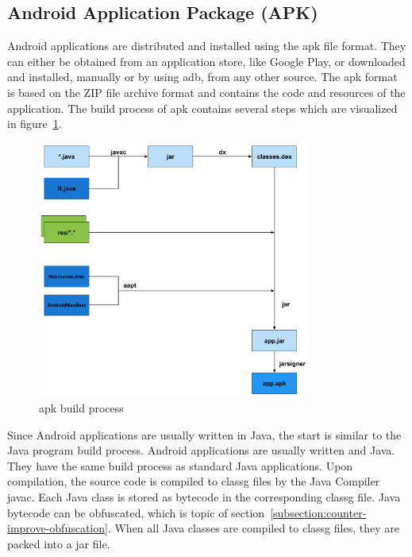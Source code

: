 \subsection{Android Application Package (APK)} \label{subsection:foundation-android-package}
Android applications are distributed and installed using the \gls{apk} file format.
They can either be obtained from an application store, like Google Play, or downloaded and installed, manually or by using \gls{adb}, from any other source.
The \gls{apk} format is based on the ZIP file archive format and contains the code and resources of the application.
\newline
The build process of \gls{apk} contains several steps which are visualized in figure~\ref{fig:apk}.
\newline
\begin{figure}[h]
    \centering
    \includegraphics[width=0.8\textwidth]{data/apk.png}
    \caption{\gls{apk} build process \cite{andevconDalvikART}}
    \label{fig:apk}
\end{figure}
Since Android applications are usually written in Java, the start is similar to the Java program build process.
Android applications are usually written and Java.
They have the same build process as standard Java applications.
Upon compilation, the source code is compiled to \gls{classg} files by the Java Compiler javac.
Each Java class is stored as bytecode in the corresponding \gls{classg} file.
Java bytecode can be obfuscated, which is topic of section~\ref{subsection:counter-improve-obfuscation}.
When all Java classes are compiled to \gls{classg} files, they are packed into a \gls{jar} file.
